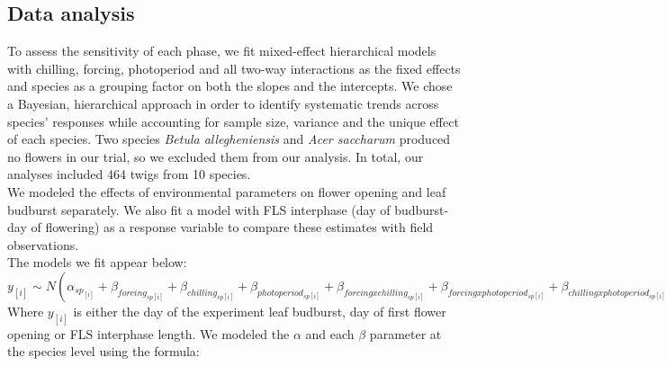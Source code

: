 \documentclass[11pt]{article}
\begin{document}
\subsection*{Data analysis}
\noindent To assess the sensitivity of each phase, we fit mixed-effect hierarchical models with chilling, forcing, photoperiod and all two-way interactions as the fixed effects and species as a grouping factor on both the slopes and the intercepts. We chose a Bayesian, hierarchical approach in order to identify systematic trends across species' responses while accounting for sample size, variance and the unique effect of each species. Two species \textit{Betula allegheniensis} and \textit{Acer saccharum} produced no flowers in our trial, so we excluded them from our analysis. In total, our analyses included 464 twigs from 10 species. \\


\noident We modeled the effects of environmental parameters on flower opening and leaf budburst separately. We also fit a model with FLS interphase (day of budburst- day of flowering) as a response variable to compare these estimates with field observations.\\

The models we fit appear below:\\

$y_{[i]} \sim N(\alpha_{sp_{[i]}}+\beta_{forcing_{sp[i]}}+\beta_{chilling_{sp[i]}}+\beta_{photoperiod_{sp[i]}}+\beta_{forcing x chilling_{sp[i]}}+\beta_{forcing x photoperiod_{sp[i]}}+\beta_{chilling x photoperiod_{sp[i]}})$\\

Where $y_{[i]}$ is either the day of the experiment leaf budburst, day of first flower opening or FLS interphase length.  We modeled the $\alpha$ and each $\beta$ parameter at the species level using the formula:\\
\end{document}
